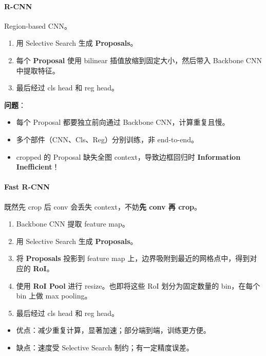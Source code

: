 \paragraph{R-CNN}\label{r-cnn}

Region-based CNN。

\begin{enumerate}
\def\labelenumi{\arabic{enumi}.}
\tightlist
\item
  用 Selective Search 生成 \textbf{Proposals}。
\item
  每个 \textbf{Proposal} 使用 bilinear 插值放缩到固定大小，然后带入
  Backbone CNN 中提取特征。
\item
  最后经过 cls head 和 reg head。
\end{enumerate}

\textbf{问题}：

\begin{itemize}
\tightlist
\item
  每个 Proposal 都要独立前向通过 Backbone CNN，计算重复且慢。
\item
  多个部件（CNN、Cls、Reg）分别训练，非 end-to-end。
\item
  cropped 的 Proposal 缺失全图 context，导致边框回归时
  \textbf{Information Inefficient}！
\end{itemize}

\paragraph{Fast R-CNN}\label{fast-r-cnn}

既然先 crop 后 conv 会丢失 context，不妨\textbf{先 conv 再 crop}。

\begin{enumerate}
\def\labelenumi{\arabic{enumi}.}
\tightlist
\item
  Backbone CNN 提取 feature map。
\item
  用 Selective Search 生成 \textbf{Proposals}。
\item
  将 \textbf{Proposals} 投影到 feature map
  上，边界吸附到最近的网格点中，得到对应的 \textbf{RoI}。
\item
  使用 \textbf{RoI Pool} 进行 resize。也即将这些 RoI 划分为固定数量的
  bin，在每个 bin 上做 max pooling。
\item
  最后经过 cls head 和 reg head。
\end{enumerate}

\begin{itemize}
\tightlist
\item
  优点：减少重复计算，显著加速；部分端到端，训练更方便。
\item
  缺点：速度受 Selective Search 制约；有一定精度误差。
\end{itemize}


